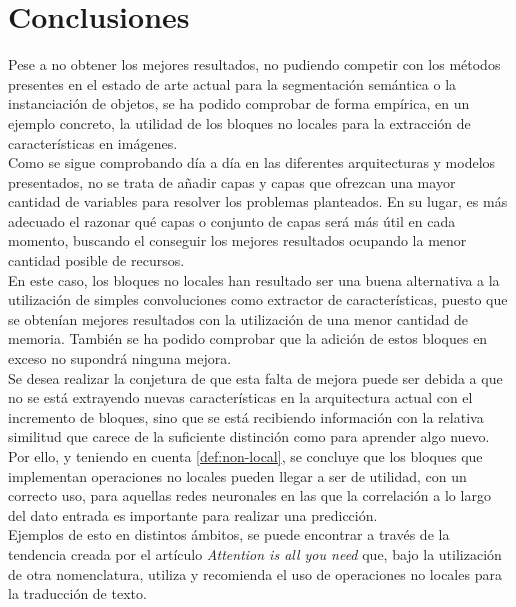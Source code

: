 \newpage
\section{Conclusiones}
Pese a no obtener los mejores resultados, no pudiendo competir con los métodos presentes en el estado de arte actual para la segmentación semántica o la instanciación de objetos, se ha podido comprobar de forma empírica, en un ejemplo concreto, la utilidad de los bloques no locales para la extracción de características en imágenes.\\

Como se sigue comprobando día a día en las diferentes arquitecturas y modelos presentados, no se trata de añadir capas y capas que ofrezcan una mayor cantidad de variables para resolver los problemas planteados. En su lugar, es más adecuado el razonar qué capas o conjunto de capas será más útil en cada momento, buscando el conseguir los mejores resultados ocupando la menor cantidad posible de recursos.\\

En este caso, los bloques no locales han resultado ser una buena alternativa a la utilización de simples convoluciones como extractor de características, puesto que se obtenían mejores resultados con la utilización de una menor cantidad de memoria. También se ha podido comprobar que la adición de estos bloques en exceso no supondrá ninguna mejora.\\

Se desea realizar la conjetura de que esta falta de mejora puede ser debida a que no se está extrayendo nuevas características en la arquitectura actual con el incremento de bloques, sino que se está recibiendo información con la relativa similitud que carece de la suficiente distinción como para aprender algo nuevo. \\

Por ello, y teniendo en cuenta \autoref{def:non-local}, se concluye que los bloques que implementan operaciones no locales pueden llegar a ser de utilidad, con un correcto uso, para aquellas redes neuronales en las que la correlación a lo largo del dato entrada es importante para realizar una predicción.\\

Ejemplos de esto en distintos ámbitos, se puede encontrar a través de la tendencia creada por el artículo \emph{Attention is all you need} \cite{DBLP:journals/corr/VaswaniSPUJGKP17} que, bajo la utilización de otra nomenclatura, utiliza y recomienda el uso de operaciones no locales para la traducción de texto.

